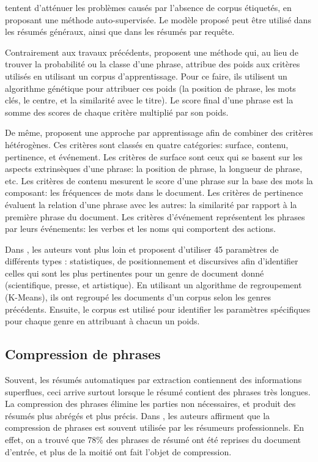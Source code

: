 \documentclass[a4paper,12pt,oneside]{../use/ESIthesis}
\begin{document}
\cite{01-amini-gallinari} tentent d'atténuer les problèmes causés par l'absence de corpus étiquetés, en proposant une méthode auto-supervisée. %
Le modèle proposé peut être utilisé dans les résumés généraux, ainsi que dans les résumés par requête. 

Contrairement aux travaux précédents, \cite{05-yeh-al} proposent une méthode qui, au lieu de trouver la probabilité ou la classe d'une phrase, attribue des poids aux critères utilisés en utilisant un corpus d'apprentissage. 
Pour ce faire, ils utilisent un algorithme génétique pour attribuer ces poids (la position de phrase, les mots clés, le centre, et la similarité avec le titre). 
Le score final d'une phrase est la somme des scores de chaque critère multiplié par son poids.

De même, \cite{08-wong-al} proposent une approche par apprentissage afin de combiner des critères hétérogènes. 
Ces critères sont classés en quatre catégories: surface, contenu, pertinence, et événement. 
Les critères de surface sont ceux qui se basent sur les aspects extrinsèques d'une phrase: la position de phrase, la longueur de phrase, etc. 
Les critères de contenu mesurent le score d'une phrase sur la base des mots la composant: les fréquences de mots dans le document.
Les critères de pertinence évaluent la relation d'une phrase avec les autres: la similarité par rapport à la première phrase du document. 
Les critères d'événement représentent les phrases par leurs événements: les verbes et les noms qui comportent des actions.

Dans \cite{10-yatsko-al}, les auteurs vont plus loin et proposent d'utiliser 45 paramètres de différents types : statistiques, de positionnement et discursives afin d'identifier celles qui sont les plus pertinentes pour un genre de document donné (scientifique, presse, et artistique).
En utilisant un algorithme de regroupement (K-Means), ils ont regroupé les documents d'un corpus selon les genres précédents. 
Ensuite, le corpus est utilisé pour identifier les paramètres spécifiques pour chaque genre en attribuant à chacun un poids. 

\subsection{Compression de phrases}

Souvent, les résumés automatiques par extraction contiennent des informations superflues, ceci arrive surtout lorsque le résumé contient des phrases très longues. 
La compression des phrases élimine les parties non nécessaires, et produit des résumés plus abrégés et plus précis. 
Dans \cite{99-jing-mckeown}, les auteurs affirment que la compression de phrases est souvent utilisée par les résumeurs professionnels. 
En effet, on a trouvé que 78\% des phrases de résumé ont été reprises du document d'entrée, et plus de la moitié ont fait l'objet de compression.
\end{document}
